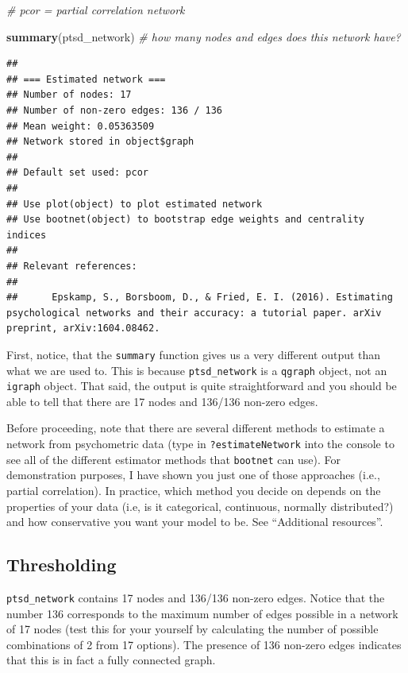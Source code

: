 \documentclass[
]{book}
\newenvironment{Shaded}{\begin{snugshade}}{\end{snugshade}}
\newcommand{\CommentTok}[1]{\textcolor[rgb]{0.56,0.35,0.01}{\textit{#1}}}
\newcommand{\FunctionTok}[1]{\textcolor[rgb]{0.13,0.29,0.53}{\textbf{#1}}}
\newcommand{\NormalTok}[1]{#1}
\begin{document}
\begin{Shaded}
\begin{Highlighting}[]
\CommentTok{\# pcor = partial correlation network}

\FunctionTok{summary}\NormalTok{(ptsd\_network) }\CommentTok{\# how many nodes and edges does this network have?}
\end{Highlighting}
\end{Shaded}

\begin{verbatim}
## 
## === Estimated network ===
## Number of nodes: 17 
## Number of non-zero edges: 136 / 136 
## Mean weight: 0.05363509 
## Network stored in object$graph 
##  
## Default set used: pcor 
##  
## Use plot(object) to plot estimated network 
## Use bootnet(object) to bootstrap edge weights and centrality indices 
## 
## Relevant references:
## 
##      Epskamp, S., Borsboom, D., & Fried, E. I. (2016). Estimating psychological networks and their accuracy: a tutorial paper. arXiv preprint, arXiv:1604.08462.
\end{verbatim}

First, notice, that the \texttt{summary} function gives us a very different output than what we are used to. This is because \texttt{ptsd\_network} is a \texttt{qgraph} object, not an \texttt{igraph} object. That said, the output is quite straightforward and you should be able to tell that there are 17 nodes and 136/136 non-zero edges.

Before proceeding, note that there are several different methods to estimate a network from psychometric data (type in \texttt{?estimateNetwork} into the console to see all of the different estimator methods that \texttt{bootnet} can use). For demonstration purposes, I have shown you just one of those approaches (i.e., partial correlation). In practice, which method you decide on depends on the properties of your data (i.e, is it categorical, continuous, normally distributed?) and how conservative you want your model to be. See ``Additional resources''.

\subsection{Thresholding}\label{thresholding}

\texttt{ptsd\_network} contains 17 nodes and 136/136 non-zero edges. Notice that the number 136 corresponds to the maximum number of edges possible in a network of 17 nodes (test this for your yourself by calculating the number of possible combinations of 2 from 17 options). The presence of 136 non-zero edges indicates that this is in fact a fully connected graph.
\end{document}
